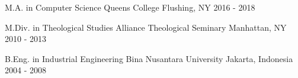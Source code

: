 

\begin{cventries}

  \cventry
    {M.A. in Computer Science} %
    {Queens College} %
    {Flushing, NY} %
    {2016 - 2018} %
    {
      \begin{cvitems} %
      \end{cvitems}
    }

  \cventry
    {M.Div. in Theological Studies} %
    {Alliance Theological Seminary} %
    {Manhattan, NY} %
    {2010 - 2013} %
    {
      \begin{cvitems} %
      \end{cvitems}
    }

  \cventry
    {B.Eng. in Industrial Engineering} %
    {Bina Nusantara University} %
    {Jakarta, Indonesia} %
    {2004 - 2008} %
    {
      \begin{cvitems} %
      \end{cvitems}
    }

\end{cventries}
